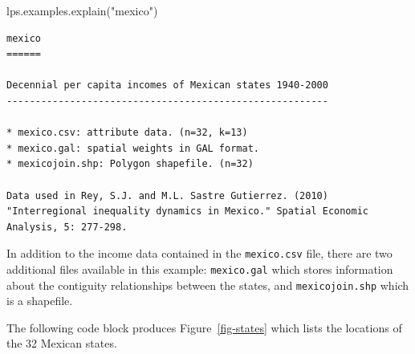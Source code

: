 \documentclass[
  a4paper, 
  twoside,
  final
]{article}
\newenvironment{Shaded}{\begin{snugshade}}{\end{snugshade}}
\newcommand{\NormalTok}[1]{\textcolor[rgb]{0.00,0.23,0.31}{#1}}
\newcommand{\StringTok}[1]{\textcolor[rgb]{0.13,0.47,0.30}{#1}}
\newcounter{code}
\begin{document}
\begin{Shaded}
\begin{Highlighting}[]
\NormalTok{lps.examples.explain(}\StringTok{"mexico"}\NormalTok{)}
\end{Highlighting}
\end{Shaded}

\begin{verbatim}
mexico
======

Decennial per capita incomes of Mexican states 1940-2000
--------------------------------------------------------

* mexico.csv: attribute data. (n=32, k=13)
* mexico.gal: spatial weights in GAL format.
* mexicojoin.shp: Polygon shapefile. (n=32)

Data used in Rey, S.J. and M.L. Sastre Gutierrez. (2010) "Interregional inequality dynamics in Mexico." Spatial Economic Analysis, 5: 277-298.
\end{verbatim}

In addition to the income data contained in the \texttt{mexico.csv}
file, there are two additional files available in this example:
\texttt{mexico.gal} which stores information about the contiguity
relationships between the states, and \texttt{mexicojoin.shp} which is a
shapefile.

The following code block produces Figure~\ref{fig-states} which lists
the locations of the 32 Mexican states.
\end{document}
